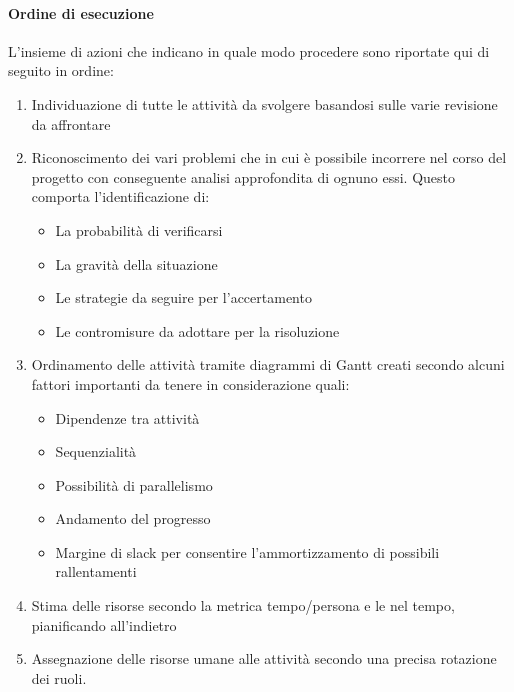			\paragraph{Ordine di esecuzione}
			L'insieme di azioni che indicano in quale modo procedere sono riportate qui di seguito in ordine:
			\begin{enumerate}
				\item Individuazione di tutte le attività da svolgere basandosi sulle varie revisione da affrontare
				\item Riconoscimento dei vari problemi che in cui è possibile incorrere nel corso del progetto con conseguente analisi approfondita di ognuno essi. Questo comporta l'identificazione di:
				\begin{itemize}
					\item La probabilità di verificarsi
					\item La gravità della situazione
					\item Le strategie da seguire per l'accertamento
					\item Le contromisure da adottare per la risoluzione
				\end{itemize}
				\item Ordinamento delle attività tramite diagrammi di Gantt creati secondo alcuni fattori importanti da tenere in considerazione quali:
				\begin{itemize}
					\item Dipendenze tra attività
					\item Sequenzialità
					\item Possibilità di parallelismo
					\item Andamento del progresso
					\item Margine di slack per consentire l'ammortizzamento di possibili rallentamenti
				\end{itemize}
			\item Stima delle risorse secondo la metrica tempo/persona e le  nel tempo, pianificando all'indietro
			\item Assegnazione delle risorse umane alle attività secondo una precisa rotazione dei ruoli.
			\end{enumerate}
		
